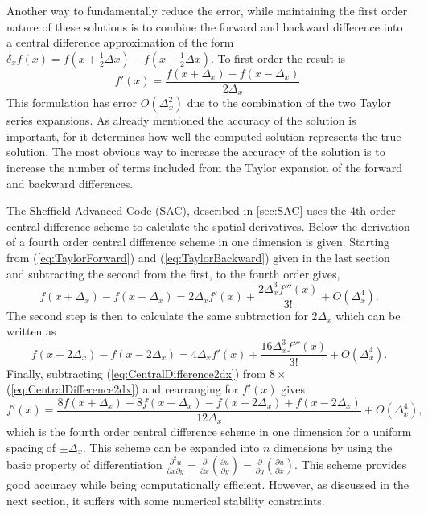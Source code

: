 Another way to fundamentally reduce the error, while maintaining the first order nature of these solutions is to combine the forward and backward difference into a central difference approximation of the form $\delta_{x}f(x)=f(x+\frac{1}{2}\Delta x)-f(x-\frac{1}{2}\Delta x)$.
To first order the result is 
\begin{equation}
f'(x)=\frac{f(x+\Delta_{x})-f(x-\Delta_{x})}{2\Delta_{x}}.\label{eq:First Order CD}
\end{equation}
This formulation has error $O(\Delta_{x}^{2})$ due to the combination of the two Taylor series expansions.
As already mentioned the accuracy of the solution is important, for it determines how well the computed solution represents the true solution.
The most obvious way to increase the accuracy of the solution is to increase the number of terms included from the Taylor expansion of the forward and backward differences.

The Sheffield Advanced Code (SAC), described in \cref{sec:SAC} uses the 4th order central difference scheme to calculate the spatial derivatives.
Below the derivation of a fourth order central difference scheme in one dimension is given.
Starting from (\ref{eq:TaylorForward}) and (\ref{eq:TaylorBackward}) given in the last section and subtracting the second from the first, to the fourth order gives,
\begin{equation}
f(x+\Delta_{x})-f(x-\Delta_{x})=2\Delta_{x}f'(x)+\frac{2\Delta_{x}^{3}f'''(x)}{3!}+O(\Delta_{x}^{4}).\label{eq:centraldifferencedx}
\end{equation}
The second step is then to calculate the same subtraction for $2\Delta_{x}$ which can be written as
\begin{equation}
f(x+2\Delta_{x})-f(x-2\Delta_{x})=4\Delta_{x}f'(x)+\frac{16\Delta_{x}^{3}f'''(x)}{3!}+O(\Delta_{x}^{4}).\label{eq:CentralDifference2dx}
\end{equation}
Finally, subtracting (\ref{eq:CentralDifference2dx}) from $8\times$(\ref{eq:CentralDifference2dx}) and rearranging for $f'(x)$ gives
\begin{equation}
f'(x)=\frac{8f(x+\Delta_{x})-8f(x-\Delta_{x})-f(x+2\Delta_{x})+f(x-2\Delta_{x})}{12\Delta_{x}}+O(\Delta_{x}^{4}),\label{eq:4thOrderCentralDifferenceUniform}
\end{equation}
which is the fourth order central difference scheme in one dimension for a uniform spacing of $\pm\Delta_{x}$.
This scheme can be expanded into $n$ dimensions by using the basic property of differentiation $\frac{\partial^{2}u}{\partial x\partial y}=\frac{\partial}{\partial x}\left(\frac{\partial u}{\partial y}\right)=\frac{\partial}{\partial y}\left(\frac{\partial u}{\partial x}\right)$.
This scheme provides good accuracy while being computationally efficient.
However, as discussed in the next section, it suffers with some numerical stability constraints.


